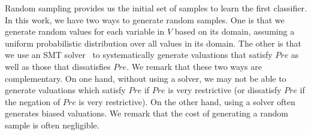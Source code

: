 %

Random sampling provides us the initial set of samples to learn the first classifier. 
In this work, we have two ways to generate random samples. One is that we generate random values for each variable in $V$ based on its domain, 
assuming a uniform probabilistic distribution over all values in its domain. 
The other is that we use an SMT solver~\cite{barrett2009satisfiability,de2008z3} to systematically generate valuations that satisfy $\mathit{Pre}$ 
as well as those that dissatisfies $\mathit{Pre}$. We remark that these two ways are complementary. 
On one hand, without using a solver, we may not be able to generate valuations which satisfy $\mathit{Pre}$ if $\mathit{Pre}$ is very restrictive 
(or dissatisfy $\mathit{Pre}$ if the negation of $\mathit{Pre}$ is very restrictive). 
On the other hand, using a solver often generates biased valuations. We remark that the cost of generating a random sample is often negligible.

